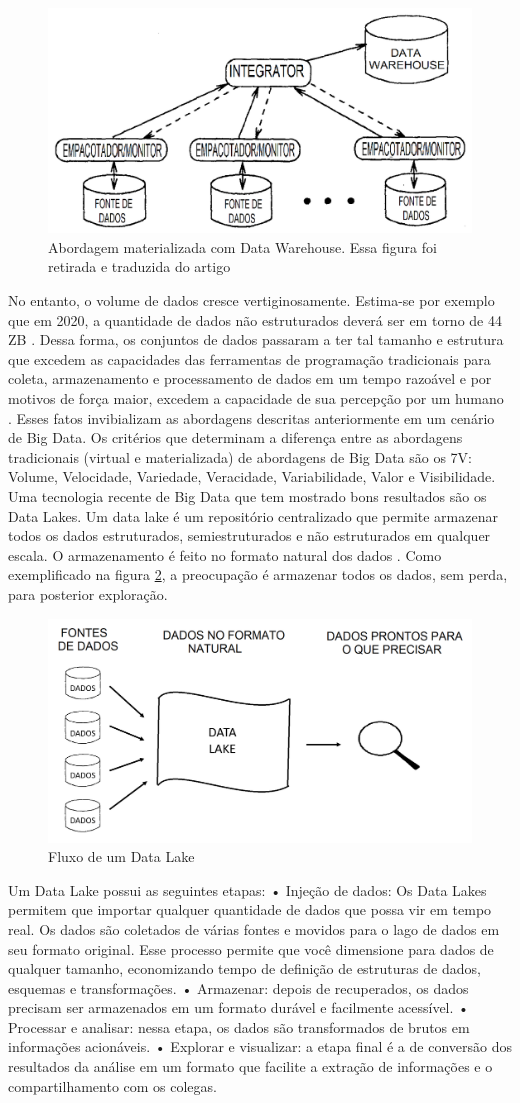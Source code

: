 \begin{figure}[!ht]
\centering
\includegraphics[width=0.3\linewidth]{figuras/DW.png}
\caption{Abordagem materializada com Data Warehouse. Essa figura foi retirada e traduzida do artigo \cite{Widom:1995:RPD:221270.221319}}
\label{fig2}
\end{figure}

No entanto, o volume de dados cresce vertiginosamente. Estima-se por exemplo que em 2020, a quantidade de dados não estruturados deverá ser em torno de 44 ZB \cite{turner2014digital}.
Dessa forma, os conjuntos de dados passaram a ter tal tamanho e estrutura que excedem as capacidades das ferramentas de programação tradicionais para coleta, armazenamento e processamento de dados em um tempo razoável e por motivos de força maior, excedem a capacidade de sua percepção por um humano \cite{miloslavskaya2014information}. Esses fatos invibializam as abordagens descritas anteriormente em um cenário de Big Data. Os critérios que determinam a diferença entre as abordagens tradicionais (virtual e materializada) de abordagens de Big Data são os 7V: Volume, Velocidade, Variedade, Veracidade, Variabilidade, Valor e Visibilidade.
Uma tecnologia recente de Big Data que tem mostrado bons resultados são os Data Lakes.
Um data lake é um repositório centralizado que permite armazenar todos os  dados estruturados, semiestruturados e não estruturados em qualquer escala. O armazenamento é feito no formato natural dos dados \cite{laskowski2016data}. Como exemplificado na figura \ref{fig3}, a preocupação é armazenar todos os dados, sem perda, para posterior exploração.

\begin{figure}[!ht]
\centering
\includegraphics[width=0.3\linewidth]{figuras/DL.png}
\caption{Fluxo de um Data Lake}
\label{fig3}
\end{figure}

Um Data Lake possui as seguintes etapas:
• Injeção de dados: Os Data Lakes permitem que importar qualquer quantidade de dados que possa vir em tempo real. Os dados são coletados de várias fontes e movidos para o lago de dados em seu formato original. Esse processo permite que você dimensione para dados de qualquer tamanho, economizando tempo de definição de estruturas de dados, esquemas e transformações.
• Armazenar: depois de recuperados, os dados precisam ser armazenados em um formato durável e facilmente acessível.
• Processar e analisar: nessa etapa, os dados são transformados de brutos em informações acionáveis.
• Explorar e visualizar: a etapa final é a de conversão dos resultados da análise em um formato que facilite a extração de informações e o compartilhamento com os colegas.

